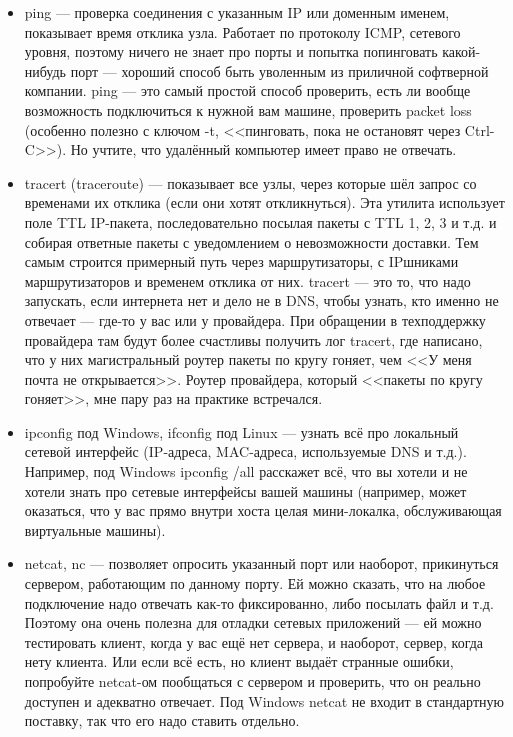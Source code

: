 \documentclass[a5paper]{article}
\begin{document}
\begin{itemize}
    \item ping --- проверка соединения с указанным IP или доменным именем, показывает время отклика узла. Работает по протоколу ICMP, сетевого уровня, поэтому ничего не знает про порты и попытка попинговать какой-нибудь порт --- хороший способ быть уволенным из приличной софтверной компании. ping --- это самый простой способ проверить, есть ли вообще возможность подключиться к нужной вам машине, проверить packet loss (особенно полезно с ключом -t, <<пинговать, пока не остановят через Ctrl-C>>). Но учтите, что удалённый компьютер имеет право не отвечать.
    \item tracert (traceroute) --- показывает все узлы, через которые шёл запрос со временами их отклика (если они хотят откликнуться). Эта утилита использует поле TTL IP-пакета, последовательно посылая пакеты с TTL 1, 2, 3 и т.д. и собирая ответные пакеты с уведомлением о невозможности доставки. Тем самым строится примерный путь через маршрутизаторы, с IPшниками маршрутизаторов и временем отклика от них. tracert --- это то, что надо запускать, если интернета нет и дело не в DNS, чтобы узнать, кто именно не отвечает --- где-то у вас или у провайдера. При обращении в техподдержку провайдера там будут более счастливы получить лог tracert, где написано, что у них магистральный роутер пакеты по кругу гоняет, чем <<У меня почта не открывается>>. Роутер провайдера, который <<пакеты по кругу гоняет>>, мне пару раз на практике встречался.
    \item ipconfig под Windows, ifconfig под Linux --- узнать всё про локальный сетевой интерфейс (IP-адреса, MAC-адреса, используемые DNS и т.д.). Например, под Windows ipconfig /all расскажет всё, что вы хотели и не хотели знать про сетевые интерфейсы вашей машины (например, может оказаться, что у вас прямо внутри хоста целая мини-локалка, обслуживающая виртуальные машины).
    \item netcat, nc --- позволяет опросить указанный порт или наоборот, прикинуться сервером, работающим по данному порту. Ей можно сказать, что на любое подключение надо отвечать как-то фиксированно, либо посылать файл и т.д. Поэтому она очень полезна для отладки сетевых приложений --- ей можно тестировать клиент, когда у вас ещё нет сервера, и наоборот, сервер, когда нету клиента. Или если всё есть, но клиент выдаёт странные ошибки, попробуйте netcat-ом пообщаться с сервером и проверить, что он реально доступен и адекватно отвечает. Под Windows netcat не входит в стандартную поставку, так что его надо ставить отдельно.

\end{itemize}
\end{document}
